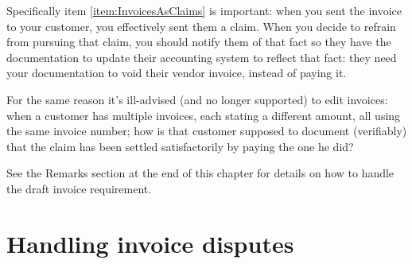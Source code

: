 Specifically item \ref{item:InvoicesAsClaims} is important: when you sent the invoice
to your customer, you effectively sent them a claim. When you decide to refrain from
pursuing that claim, you should notify them of that fact so they have the documentation
to update their accounting system to reflect that fact: they need your documentation
to void their vendor invoice, instead of paying it.

For the same reason it's ill-advised (and no longer supported) to edit invoices:
when a customer has multiple invoices, each stating a different amount, all
using the same invoice number; how is that customer supposed to document (verifiably)
that the claim has been settled satisfactorily by paying the one he did?

See the Remarks section at the end of this chapter for details on how to handle
the draft invoice requirement.

\section{Handling invoice disputes}

%
%
%
%
%
%
%
%
%
%
%
%
%


